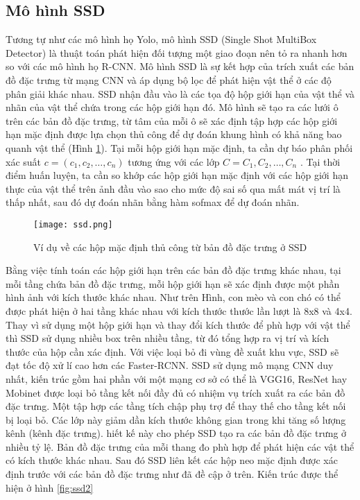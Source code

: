 \documentclass[../the.tex]{subfiles}
\begin{document}
\subsection{Mô hình SSD} 
{\fontsize{13}{12} \selectfont 
Tương tự như các mô hình họ Yolo, mô hình SSD \cite{Liu_2016} (Single Shot MultiBox Detector) là thuật toán phát hiện đối tượng một giao đoạn nên tỏ ra nhanh hơn so với các mô hình họ R-CNN. 
Mô hình SSD là sự kết hợp của trích xuất các bản đồ đặc trưng từ mạng CNN và áp dụng bộ lọc để phát hiện vật thể ở các độ phân giải khác nhau. SSD nhận đầu vào là các tọa độ hộp giới hạn của vật thể và nhãn của vật thể chứa trong các hộp giới hạn đó. 
Mô hình sẽ tạo ra các lưới ô trên các bản đồ đặc trưng, từ tâm của mỗi ô sẽ xác định tập hợp các hộp giới hạn mặc định được lựa chọn thủ công để dự đoán khung hình có khả năng bao quanh vật thể (Hình \ref{fig:ssd}). 
Tại mỗi hộp giới hạn mặc định, ta cần dự báo phân phối xác suất $c = (c_1, c_2,\dots, c_n)$ tương ứng với các lớp $C= C_1, C_2,\dots,C_n $ . Tại thời điểm huấn luyện, ta cần so khớp các hộp giới hạn mặc định với các hộp giới hạn thực của vật thể trên ảnh đầu vào sao cho mức độ sai số qua mất mát vị trí là thấp nhất, sau đó dự đoán nhãn bằng hàm sofmax để dự đoán nhãn.
}
\begin{figure}[H]
	\centering
	\texttt{[image: ssd.png]}
	\caption{Ví dụ về các hộp mặc định thủ công từ bản đồ đặc trưng ở SSD \cite{Liu_2016}}
	\label{fig:ssd}
\end{figure}
\bigskip

{\fontsize{13}{12} \selectfont 
Bằng việc tính toán các hộp giới hạn trên các bản đồ đặc trưng khác nhau, tại mỗi tầng chứa bản đồ đặc trưng, mỗi hộp giới hạn sẽ xác định được một phần hình ảnh với kích thước khác nhau. Như trên Hình, con mèo và con chó có thể được phát hiện ở hai tầng khác nhau với kích thước thước lần lượt là 8x8 và 4x4. Thay vì sử dụng một hộp giới hạn và thay đổi kích thước để phù hợp với vật thể thì SSD sử dụng nhiều box trên nhiều tầng, từ đó tổng hợp ra vị trí và kích thước của hộp cần xác định. Với việc loại bỏ đi vùng đề xuất khu vực, SSD sẽ đạt tốc độ xử lí cao hơn các Faster-RCNN. 
SSD sử dụng mô mạng CNN duy nhất, kiến trúc gồm hai phần với một mạng cơ sở có thể là VGG16, ResNet hay Mobinet được loại bỏ tầng kết nối đầy đủ có nhiệm vụ trích xuất ra các bản đồ đặc trưng. 
Một tập hợp các tầng tích chập phụ trợ để thay thế cho tầng kết nối bị loại bỏ. Các lớp này giảm dần kích thước không gian trong khi tăng số lượng kênh (kênh đặc trưng). hiết kế này cho phép SSD tạo ra các bản đồ đặc trưng ở nhiều tỷ lệ. Bản đồ đặc trưng của mỗi thang đo phù hợp để phát hiện các vật thể có kích thước khác nhau. 
Sau đó SSD liên kết các hộp neo mặc định được xác định trước với các bản đồ đặc trưng như đã đề cập ở trên.
Kiến trúc được thể hiện ở hình \ref{fig:ssd2}
}
\end{document}
